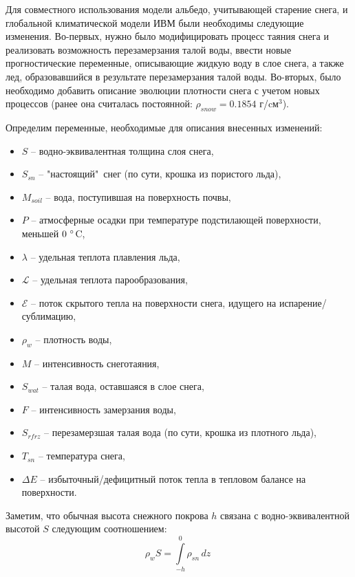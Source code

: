 \documentclass[a4paper, fontsize=14pt]{scrartcl}
\begin{document}
Для совместного использования модели альбедо, учитывающей старение снега, и глобальной климатической модели ИВМ были необходимы следующие изменения. Во-первых, нужно было модифицировать процесс таяния снега и реализовать возможность перезамерзания талой воды, ввести новые прогностические переменные, описывающие жидкую воду в слое снега, а также лед, образовавшийся в результате перезамерзания талой воды. Во-вторых, было необходимо добавить описание эволюции плотности снега с учетом новых процессов (ранее она считалась постоянной: $\rho_{snow} = 0.1854 $ г/cм$^3$).

Определим переменные, необходимые для описания внесенных изменений: 
\begin{itemize}
    \item $S$ -- водно-эквивалентная толщина слоя снега,
    \item $S_{sn}$ -- "настоящий"\  снег (по сути, крошка из пористого льда), 
    \item $M_{soil}$ -- вода, поступившая на поверхность почвы,
    \item $P$ -- атмосферные осадки при температуре подстилающей поверхности, меньшей $0 ~\degree$C,
    \item $\lambda$ -- удельная теплота плавления льда, 
    \item $\mathcal{L}$ -- удельная теплота парообразования, 
    \item $\mathcal{E}$ -- поток скрытого тепла на поверхности снега, идущего на испарение/сублимацию,
    \item $\rho_w$ -- плотность воды,
    \item $M$ -- интенсивность снеготаяния,
    \item $S_{wat}$ -- талая вода, оставшаяся в слое снега,
    \item $F$ -- интенсивность замерзания воды,
    \item $S_{rfrz}$ -- перезамерзшая талая вода (по сути, крошка из плотного льда),
    \item $T_{sn}$ -- температура снега, 
    \item $\Delta E$ -- избыточный/дефицитный поток тепла в тепловом балансе на поверхности.
\end{itemize}
Заметим, что обычная высота снежного покрова $h$ связана с водно-эквивалентной высотой $S$ следующим соотношением:
\begin{equation}
    \rho_w S =  \int\limits_{-h}^0 \rho_{sn} \, dz\  \label{sys}
\end{equation}
\end{document}

